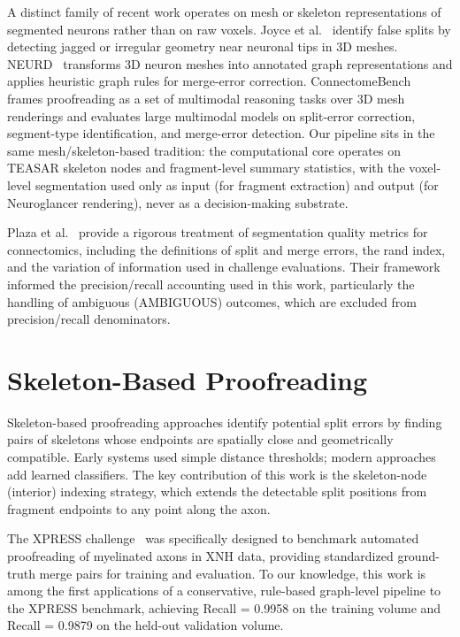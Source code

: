 A distinct family of recent work operates on mesh or skeleton
representations of segmented neurons rather than on raw voxels. Joyce et
al.~\cite{joyce2023mesh} identify false splits by detecting jagged or
irregular geometry near neuronal tips in 3D meshes.
NEURD~\cite{celii2025neurd} transforms 3D neuron meshes into annotated
graph representations and applies heuristic graph rules for
merge-error correction. ConnectomeBench~\cite{brown2025connectomebench}
frames proofreading as a set of multimodal reasoning tasks over 3D mesh
renderings and evaluates large multimodal models on split-error
correction, segment-type identification, and merge-error detection.
Our pipeline sits in the same mesh/skeleton-based tradition: the
computational core operates on TEASAR skeleton nodes and fragment-level
summary statistics, with the voxel-level segmentation used only as
input (for fragment extraction) and output (for Neuroglancer rendering),
never as a decision-making substrate.

Plaza et al.~\cite{plaza2018analyzing} provide a rigorous treatment of
segmentation quality metrics for connectomics, including the definitions of
split and merge errors, the rand index, and the variation of information used
in challenge evaluations. Their framework informed the precision/recall
accounting used in this work, particularly the handling of ambiguous (AMBIGUOUS)
outcomes, which are excluded from precision/recall denominators.

\section{Skeleton-Based Proofreading}

Skeleton-based proofreading approaches identify potential split errors by
finding pairs of skeletons whose endpoints are spatially close and geometrically
compatible. Early systems used simple distance thresholds; modern approaches
add learned classifiers. The key contribution of this work is the skeleton-node
(interior) indexing strategy, which extends the detectable split positions from
fragment endpoints to any point along the axon.

The XPRESS challenge~\cite{xpress2023} was specifically designed to benchmark
automated proofreading of myelinated axons in XNH data, providing standardized
ground-truth merge pairs for training and evaluation. To our knowledge, this
work is among the first applications of a conservative, rule-based graph-level
pipeline to the XPRESS benchmark, achieving Recall = 0.9958 on the training volume
and Recall = 0.9879 on the held-out validation volume.


